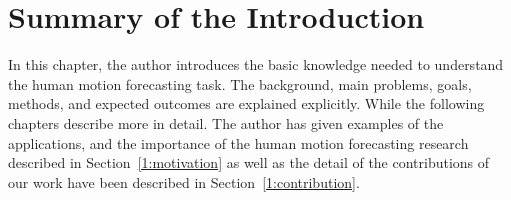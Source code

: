 \section{Summary of the Introduction}\label{1:summary} 
In this chapter, the author introduces the basic knowledge needed to understand the human motion forecasting task. The background, main problems, goals, methods, and expected outcomes are explained explicitly. While the following chapters describe more in detail.
The author has given examples of the applications, and the importance of the human motion forecasting research described in Section~\ref{1:motivation} as well as the detail of the contributions of our work have been described in Section~\ref{1:contribution}.










